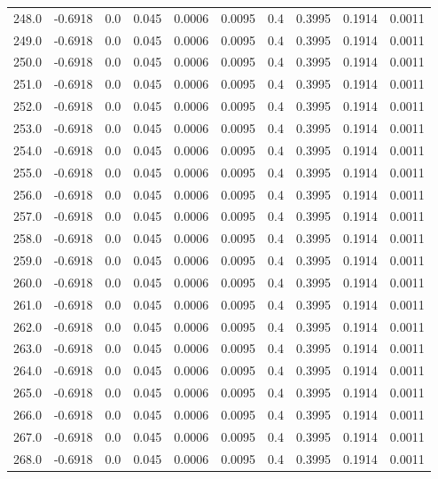 \begin{longtable}{lrrrrrrrrr}
248.0 & -0.6918 & 0.0 & 0.045 & 0.0006 & 0.0095 & 0.4 & 0.3995 & 0.1914 & 0.0011 \\
249.0 & -0.6918 & 0.0 & 0.045 & 0.0006 & 0.0095 & 0.4 & 0.3995 & 0.1914 & 0.0011 \\
250.0 & -0.6918 & 0.0 & 0.045 & 0.0006 & 0.0095 & 0.4 & 0.3995 & 0.1914 & 0.0011 \\
251.0 & -0.6918 & 0.0 & 0.045 & 0.0006 & 0.0095 & 0.4 & 0.3995 & 0.1914 & 0.0011 \\
252.0 & -0.6918 & 0.0 & 0.045 & 0.0006 & 0.0095 & 0.4 & 0.3995 & 0.1914 & 0.0011 \\
253.0 & -0.6918 & 0.0 & 0.045 & 0.0006 & 0.0095 & 0.4 & 0.3995 & 0.1914 & 0.0011 \\
254.0 & -0.6918 & 0.0 & 0.045 & 0.0006 & 0.0095 & 0.4 & 0.3995 & 0.1914 & 0.0011 \\
255.0 & -0.6918 & 0.0 & 0.045 & 0.0006 & 0.0095 & 0.4 & 0.3995 & 0.1914 & 0.0011 \\
256.0 & -0.6918 & 0.0 & 0.045 & 0.0006 & 0.0095 & 0.4 & 0.3995 & 0.1914 & 0.0011 \\
257.0 & -0.6918 & 0.0 & 0.045 & 0.0006 & 0.0095 & 0.4 & 0.3995 & 0.1914 & 0.0011 \\
258.0 & -0.6918 & 0.0 & 0.045 & 0.0006 & 0.0095 & 0.4 & 0.3995 & 0.1914 & 0.0011 \\
259.0 & -0.6918 & 0.0 & 0.045 & 0.0006 & 0.0095 & 0.4 & 0.3995 & 0.1914 & 0.0011 \\
260.0 & -0.6918 & 0.0 & 0.045 & 0.0006 & 0.0095 & 0.4 & 0.3995 & 0.1914 & 0.0011 \\
261.0 & -0.6918 & 0.0 & 0.045 & 0.0006 & 0.0095 & 0.4 & 0.3995 & 0.1914 & 0.0011 \\
262.0 & -0.6918 & 0.0 & 0.045 & 0.0006 & 0.0095 & 0.4 & 0.3995 & 0.1914 & 0.0011 \\
263.0 & -0.6918 & 0.0 & 0.045 & 0.0006 & 0.0095 & 0.4 & 0.3995 & 0.1914 & 0.0011 \\
264.0 & -0.6918 & 0.0 & 0.045 & 0.0006 & 0.0095 & 0.4 & 0.3995 & 0.1914 & 0.0011 \\
265.0 & -0.6918 & 0.0 & 0.045 & 0.0006 & 0.0095 & 0.4 & 0.3995 & 0.1914 & 0.0011 \\
266.0 & -0.6918 & 0.0 & 0.045 & 0.0006 & 0.0095 & 0.4 & 0.3995 & 0.1914 & 0.0011 \\
267.0 & -0.6918 & 0.0 & 0.045 & 0.0006 & 0.0095 & 0.4 & 0.3995 & 0.1914 & 0.0011 \\
268.0 & -0.6918 & 0.0 & 0.045 & 0.0006 & 0.0095 & 0.4 & 0.3995 & 0.1914 & 0.0011 \\

\end{longtable}
